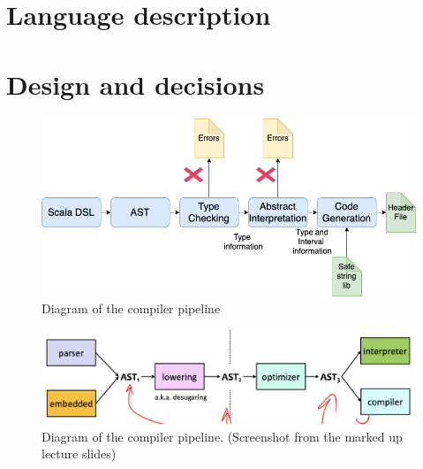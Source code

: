 \documentclass[letterpaper]{article}
\begin{document}
\section{Language description}


\section{Design and decisions}

\begin{figure}[h]
  \centering
  \includegraphics[width=\textwidth]{architecture.png}
  \caption{Diagram of the compiler pipeline}
  \label{fig:pipeline}
\end{figure}

\begin{figure}[h]
  \centering
  \includegraphics[width=\textwidth]{modern-compiler-pipeline.png}
  \caption{Diagram of the compiler pipeline. (Screenshot from the marked up lecture slides)}
  \label{fig:mdnpipeline}
\end{figure}

\end{document}
